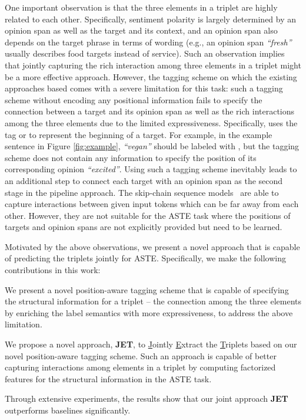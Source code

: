 \documentclass[11pt,a4paper]{article}
\newcounter{Lcount}
\newcommand{\squishlist}{
\begin{list}{}
{ \usecounter{Lcount}
\setlength{\itemsep}{0pt}
\setlength{\parsep}{0pt}
\setlength{\topsep}{0pt}
\setlength{\partopsep}{0pt}
\setlength{\leftmargin}{2em}
\setlength{\labelwidth}{1.5em}
\setlength{\labelsep}{0.5em} } }
\newcommand{\squishend}{
\end{list} }
\begin{document}
One important observation is that the three elements in a triplet are highly related to each other. 
Specifically, sentiment polarity is largely determined by an opinion span as well as the target and its context, and an opinion span also depends on the target phrase in terms of wording (e.g., an opinion span \textit{``fresh''} usually describes food targets instead of service).
Such an observation implies that jointly capturing the rich interaction among three elements in a triplet might be a more effective approach.
However, the  tagging scheme on which the existing approaches based comes with a severe limitation for this task:
such a tagging scheme without encoding any positional information fails to specify the connection between a target and its opinion span as well as the rich interactions among the three elements due to the limited expressiveness.
Specifically,   uses the tag  or  to represent the beginning of a target. For example, in the example sentence in Figure \ref{fig:example}, \textit{``vegan''} should be labeled with , but the tagging scheme does not contain any information to specify the position of its corresponding opinion \textit{``excited''}.
Using such a tagging scheme inevitably leads to an additional step to connect each target with an opinion span as the second stage in the pipeline approach.
{\color{black}The skip-chain sequence models~\cite{sutton2004collective, galley-2006-skip} are able to capture interactions between given input tokens which can be far away from each other.
However, they are not suitable for the ASTE task where the positions of targets and opinion spans are not explicitly provided but need to be learned.}




Motivated by the above observations, we present a novel approach that is capable of predicting the triplets jointly for ASTE. Specifically, we make the following contributions in this work:
\squishlist
\item  We present a novel position-aware tagging scheme that is capable of specifying the structural information for a triplet -- the connection among the three elements by enriching the label semantics with more expressiveness, to address the above limitation.
\item We propose a novel approach, \textbf{JET}, to \underline{J}ointly \underline{E}xtract the \underline{T}riplets based on our novel position-aware tagging scheme. 
Such an approach is capable of better capturing interactions among elements in a triplet by computing factorized features for the structural information in the ASTE task.
\item Through extensive experiments, the results show that our joint approach \textbf{JET} outperforms baselines significantly.
\squishend
\end{document}
